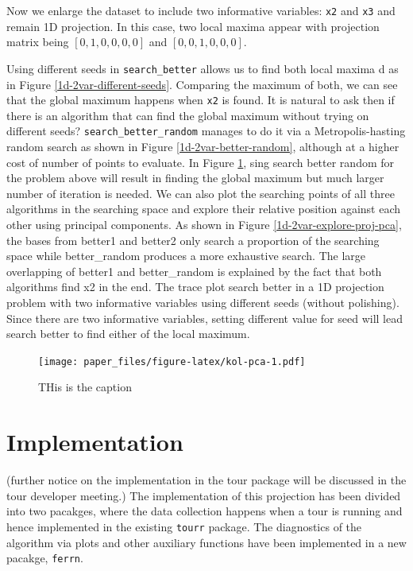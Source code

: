 \documentclass[12pt]{article}
\begin{document}
Now we enlarge the dataset to include two informative variables: \texttt{x2} and \texttt{x3} and remain 1D projection. In this case, two local maxima appear with projection matrix being \([0, 1, 0, 0, 0, 0]\) and \([0, 0, 1 ,0, 0, 0]\).

Using different seeds in \texttt{search\_better} allows us to find both local maxima d as in Figure \ref{1d-2var-different-seeds}. Comparing the maximum of both, we can see that the global maximum happens when \texttt{x2} is found. It is natural to ask then if there is an algorithm that can find the global maximum without trying on different seeds? \texttt{search\_better\_random} manages to do it via a Metropolis-hasting random search as shown in Figure \ref{1d-2var-better-random}, although at a higher cost of number of points to evaluate. In Figure \ref{kol-pca},
sing search better random for the problem above will result in finding the global maximum but much larger number of iteration is needed. We can also plot the searching points of all three algorithms in the searching space and explore their relative position against each other using principal components. As shown in Figure \ref{1d-2var-explore-proj-pca}, the bases from better1 and better2 only search a proportion of the searching space while better\_random produces a more exhaustive search. The large overlapping of better1 and better\_random is explained by the fact that both algorithms find x2 in the end.
The trace plot search better in a 1D projection problem with two informative variables using different seeds (without polishing). Since there are two informative variables, setting different value for seed will lead search better to find either of the local maximum.

\begin{figure}
\centering
\texttt{[image: paper\_files/figure-latex/kol-pca-1.pdf]}
\caption{\label{fig:kol-pca}\label{kol-pca}THis is the caption}
\end{figure}

\hypertarget{implementation}{%
\section{Implementation}\label{implementation}}

(further notice on the implementation in the tour package will be discussed in the tour developer meeting.)
The implementation of this projection has been divided into two pacakges, where the data collection happens when a tour is running and hence implemented in the existing \texttt{tourr} package. The diagnostics of the algorithm via plots and other auxiliary functions have been implemented in a new pacakge, \texttt{ferrn}.
\end{document}
